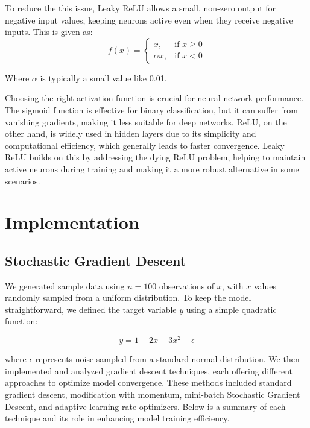 \documentclass{article}
\newcommand{\0}{\mathbf{0}}
\newcommand{\1}{\mathbf{1}}
\begin{document}
To reduce the this issue, Leaky ReLU allows a small, non-zero output for negative input values, keeping neurons active even when they receive negative inputs. This is given as: 
\begin{equation}
        f(x) = \begin{cases}
            x, & \text{if } x \geq 0 \\
            \alpha x, & \text{if } x < 0
            \label{leakyrelu}
\end{cases}
\end{equation}

Where \( \alpha \) is typically a small value like 0.01.




Choosing the right activation function is crucial for neural network performance. The sigmoid function is effective for binary classification, but it can suffer from vanishing gradients, making it less suitable for deep networks. ReLU, on the other hand, is widely used in hidden layers due to its simplicity and computational efficiency, which generally leads to faster convergence. Leaky ReLU builds on this by addressing the dying ReLU problem, helping to maintain active neurons during training and making it a more robust alternative in some scenarios. 





\section{Implementation}



\subsection{Stochastic Gradient Descent}


We generated sample data using \(n = 100\) observations of \(x\), with \(x\) values randomly sampled from a uniform distribution. To keep the model straightforward, we defined the target variable \(y\) using a simple quadratic function:

\begin{equation}
    y = 1 + 2x + 3x^2 + \epsilon
\end{equation}

where \(\epsilon\) represents noise sampled from a standard normal distribution.                                                      
We then implemented and analyzed gradient descent techniques, each offering different approaches to optimize model convergence. These methods included standard gradient descent, modification with momentum, mini-batch Stochastic Gradient Descent, and adaptive learning rate optimizers. Below is a summary of each technique and its role in enhancing model training efficiency. 
\end{document}
